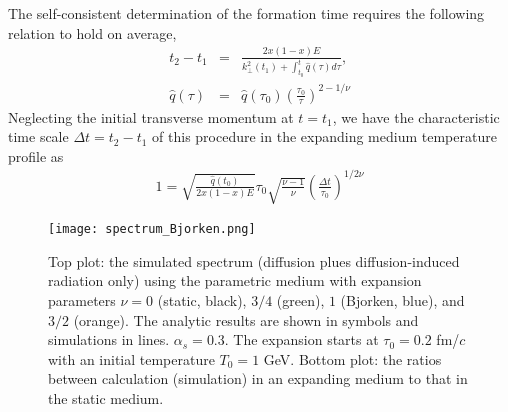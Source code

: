 The self-consistent determination of the formation time requires the following relation to hold on average,
\begin{eqnarray}
t_2 - t_1 &=& \frac{2x(1-x)E}{k_{\perp}^2(t_1) + \int_{t_0}^{t} \hat{q}(\tau) d\tau},\\
\hat{q}(\tau) &=& \hat{q}(\tau_0) \left(\frac{\tau_0}{\tau}\right)^{2-1/\nu}
\end{eqnarray}
Neglecting the initial transverse momentum at $t=t_1$, we have the characteristic time scale $\Delta t = t_2 - t_1$ of this procedure in the expanding medium temperature profile as
\begin{eqnarray}
1 = \sqrt{\frac{\hat{q}(t_0)}{2x(1-x)E}} \tau_0 \sqrt{\frac{\nu-1}{\nu}} \left(\frac{\Delta t}{\tau_0}\right)^{1/2\nu}
\end{eqnarray}

\begin{figure}
\centering
\texttt{[image: spectrum\_Bjorken.png]}
\caption{Top plot: the simulated spectrum (diffusion plues diffusion-induced radiation only) using the parametric medium with expansion parameters $\nu = 0$ (static, black), $3/4$ (green), $1$ (Bjorken, blue), and $3/2$ (orange). The analytic results are shown in symbols and simulations in lines. $\alpha_s=0.3$. The expansion starts at $\tau_0 = 0.2$ fm/$c$ with an initial temperature $T_0 = 1$ GeV. Bottom plot: the ratios between calculation (simulation) in an expanding medium to that in the static medium.}
\label{fig:Bjorken-BDMPS}
\end{figure}

